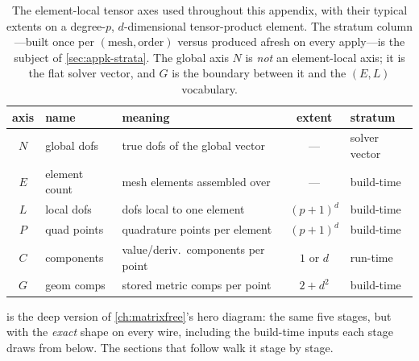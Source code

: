 \begin{table}[t]
\centering
\caption[The five element-local axes, with extents]{The element-local tensor axes
used throughout this appendix, with their typical extents on a degree-$p$,
$d$-dimensional tensor-product element. The stratum column---built once per
$(\text{mesh},\text{order})$ versus produced afresh on every apply---is the subject
of \cref{sec:appk-strata}. The global axis $N$ is \emph{not} an element-local axis;
it is the flat solver vector, and $G$ is the boundary between it and the
$(E,L)$ vocabulary.}
\label{tab:appk-axes}
\small
\setlength{\tabcolsep}{4.5pt}
\renewcommand{\arraystretch}{1.25}
\begin{tabular}{@{}cllcl@{}}
\toprule
axis & name & meaning & extent & stratum \\
\midrule
$N$ & global dofs & true dofs of the global vector & --- & solver vector \\
$E$ & element count & mesh elements assembled over & --- & build-time \\
$L$ & local dofs & dofs local to one element & $(p{+}1)^d$ & build-time \\
$P$ & quad points & quadrature points per element & $(p{+}1)^d$ & build-time \\
$C$ & components & value/deriv.\ components per point & $1$ or $d$ & run-time \\
$G$ & geom comps & stored metric comps per point & $2+d^2$ & build-time \\
\bottomrule
\end{tabular}
\end{table}

 is the deep version of \cref{ch:matrixfree}'s hero
diagram: the same five stages, but with the \emph{exact} shape on every wire,
including the build-time inputs each stage draws from below. The sections that
follow walk it stage by stage.


